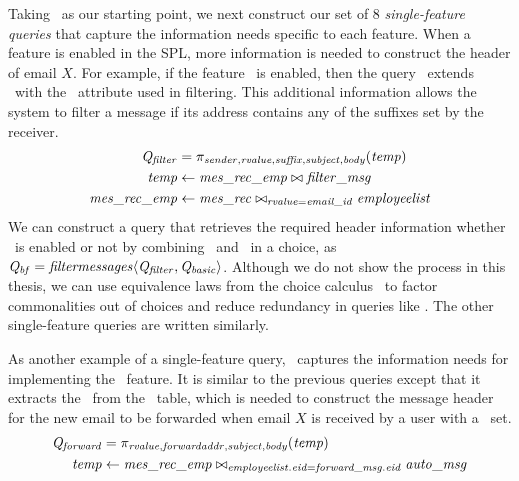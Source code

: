 Taking \Qbasic\ as our starting point, we next construct our set of $8$
\emph{single-feature queries} that capture the information needs specific to
each feature.
%
When a feature is enabled in the SPL, more information is needed to construct
the header of email $X$. For example, if the feature \filtermessages\ is
enabled, then the query \Qfilter\ extends \Qbasic\ with the \suffix\ attribute
used in filtering. This additional information allows the system to filter a
message if its address contains any of the suffixes set by the receiver.
%
%
\begin{align*}
\Qfilter &= 
\projectRel{\sender,\rvalue,\suffix,\subject,\body} {(\temp)} \\
\temp & \leftarrow \mretable
 \bowtie \filtermsg \\
\mretable &\leftarrow \joinRel{\mrtable}{\employees}{\rvalue=\emailid}
\end{align*}
%
%
\noindent
We can construct a query that retrieves the required header information whether
\filtermessages\ is enabled or not by combining \Qbasic\ and \Qfilter\ in a
choice, as $\Qbf=\chc[\filtermessages]{\Qfilter,\Qbasic}$. 
%
Although we do not show the process in this thesis, we can use equivalence laws
from the choice calculus~\cite{EW11tosem,HW16fosd} to factor commonalities out
of choices and reduce redundancy in queries like \Qbf.
The other single-feature queries are written similarly.



As another example of a single-feature query, \Qforward\ captures the
information needs for implementing the \forwardmessages\ feature. It is similar
to the previous queries except that it extracts the \forwardaddr\ from the
\automsg\ table, which is needed to construct the message header for the new
email to be forwarded when email $X$ is received by a user with a \forwardaddr\
set.
%
\begin{align*}
\Qforward &=
\projectRel{\rvalue,\forwardaddr,\subject,\body}{(\temp)} \\
\temp &\leftarrow \mretable 
 \bowtie_{\employees.\eid = \forwardmsg.\eid} \automsg
\end{align*}

